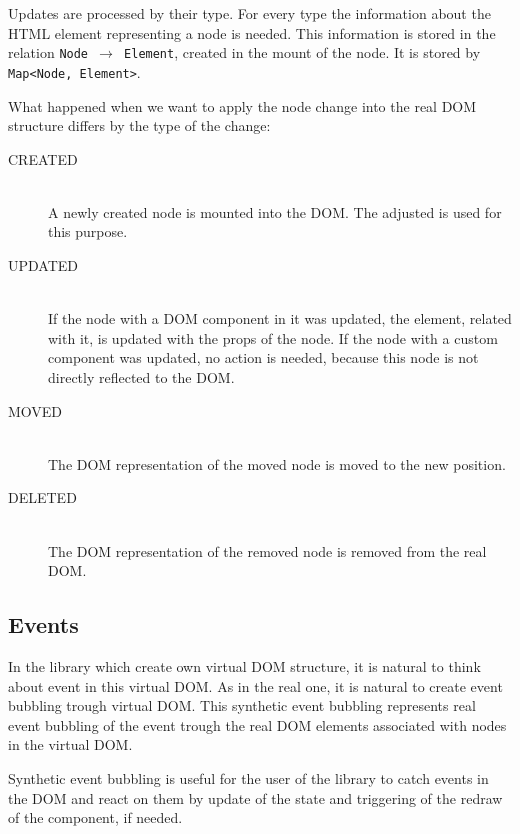         Updates are processed by their type. 
        For every type the information about the HTML element representing a node is needed. 
        This information is stored in the relation \mbox{\texttt{Node $\rightarrow$ Element}}, 
        created in the mount of the node. 
        It is stored by \texttt{Map<Node, Element>}.

        What happened when we want to apply the node change into the real DOM structure differs by the type of the change:
        \begin{description}
          \item[CREATED] \hfill \\
            A newly created node is mounted into the DOM. 
            The adjusted  is used for this purpose.
          \item[UPDATED] \hfill \\
            If the node with a DOM component in it was updated, the element, related with it, is updated with the props of the node.
            If the node with a custom component was updated, no action is needed, because this node is not directly reflected to the DOM.
          \item[MOVED] \hfill \\
            The DOM representation of the moved node is moved to the new position.
          \item[DELETED] \hfill \\
            The DOM representation of the removed node is removed from the real DOM. 
        \end{description}

  \subsection{Events}\label{subsec:our-architecture-events}

    In the library which create own virtual DOM structure, it is natural to think about event in this virtual DOM. 
    As in the real one, it is natural to create event bubbling trough virtual DOM. 
    This synthetic event bubbling represents real event bubbling of the event 
    trough the real DOM elements associated with nodes in the virtual DOM.

    Synthetic event bubbling is useful for the user of the library to catch events in the DOM and react on them by update of the state 
    and triggering of the redraw of the component, if needed. 

